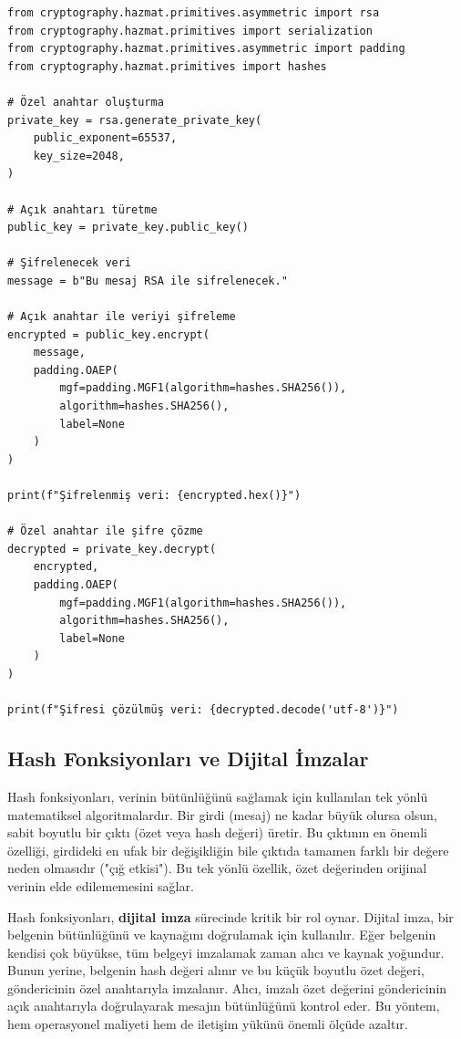 \begin{verbatim}
from cryptography.hazmat.primitives.asymmetric import rsa
from cryptography.hazmat.primitives import serialization
from cryptography.hazmat.primitives.asymmetric import padding
from cryptography.hazmat.primitives import hashes
 
# Özel anahtar oluşturma
private_key = rsa.generate_private_key(
    public_exponent=65537,
    key_size=2048,
)
 
# Açık anahtarı türetme
public_key = private_key.public_key()
 
# Şifrelenecek veri
message = b"Bu mesaj RSA ile sifrelenecek."
 
# Açık anahtar ile veriyi şifreleme
encrypted = public_key.encrypt(
    message,
    padding.OAEP(
        mgf=padding.MGF1(algorithm=hashes.SHA256()),
        algorithm=hashes.SHA256(),
        label=None
    )
)
 
print(f"Şifrelenmiş veri: {encrypted.hex()}")
 
# Özel anahtar ile şifre çözme
decrypted = private_key.decrypt(
    encrypted,
    padding.OAEP(
        mgf=padding.MGF1(algorithm=hashes.SHA256()),
        algorithm=hashes.SHA256(),
        label=None
    )
)
 
print(f"Şifresi çözülmüş veri: {decrypted.decode('utf-8')}")
\end{verbatim}

\subsection{Hash Fonksiyonları ve Dijital İmzalar}

Hash fonksiyonları, verinin bütünlüğünü sağlamak için kullanılan tek yönlü matematiksel algoritmalardır. Bir girdi (mesaj) ne kadar büyük olursa olsun, sabit boyutlu bir çıktı (özet veya hash değeri) üretir. Bu çıktının en önemli özelliği, girdideki en ufak bir değişikliğin bile çıktıda tamamen farklı bir değere neden olmasıdır ("çığ etkisi"). Bu tek yönlü özellik, özet değerinden orijinal verinin elde edilememesini sağlar.

Hash fonksiyonları, \textbf{dijital imza} sürecinde kritik bir rol oynar. Dijital imza, bir belgenin bütünlüğünü ve kaynağını doğrulamak için kullanılır. Eğer belgenin kendisi çok büyükse, tüm belgeyi imzalamak zaman alıcı ve kaynak yoğundur. Bunun yerine, belgenin hash değeri alınır ve bu küçük boyutlu özet değeri, göndericinin özel anahtarıyla imzalanır. Alıcı, imzalı özet değerini göndericinin açık anahtarıyla doğrulayarak mesajın bütünlüğünü kontrol eder. Bu yöntem, hem operasyonel maliyeti hem de iletişim yükünü önemli ölçüde azaltır.

